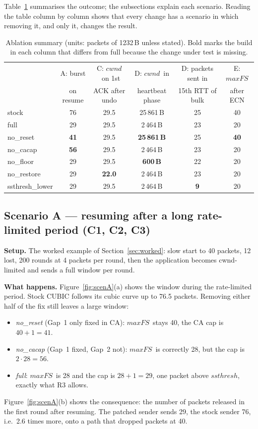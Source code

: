 \documentclass[11pt,a4paper]{article}
\newcommand{\maxfs}{\ensuremath{\mathit{maxFS}}}
\newcommand{\cwnd}{\ensuremath{\mathit{cwnd}}}
\newcommand{\ssthresh}{\ensuremath{\mathit{ssthresh}}}
\begin{document}
Table~\ref{tab:ablation} summarises the outcome; the subsections explain each
scenario. Reading the table column by column shows that every change has a
scenario in which removing it, and only it, changes the result.

\begin{table}[ht]
\centering
\small
\caption{Ablation summary (units: packets of 1232\,B unless stated). Bold
  marks the build in each column that differs from \textcolor{patched}{full}
  because the change under test is missing.}
\label{tab:ablation}
\begin{tabular}{@{}lccccc@{}}
\toprule
 & A: burst & C: \cwnd\ on 1st & D: \cwnd\ in & D: packets sent in & E: \maxfs \\
 & on resume & ACK after undo & heartbeat phase & 15th RTT of bulk & after ECN \\
\midrule
\textcolor{stock}{stock}   & 76 & 29.5 & 25\,861\,B & 25 & 40 \\
\textcolor{patched}{full}  & 29 & 29.5 & 2\,464\,B  & 23 & 20 \\
no\_reset       & \textbf{41} & 29.5 & \textbf{25\,861\,B} & 25 & \textbf{40} \\
no\_cacap       & \textbf{56} & 29.5 & 2\,464\,B  & 23 & 20 \\
no\_floor       & 29 & 29.5 & \textbf{600\,B} & 22 & 20 \\
no\_restore     & 29 & \textbf{22.0} & 2\,464\,B  & 23 & 20 \\
ssthresh\_lower & 29 & 29.5 & 2\,464\,B  & \textbf{9} & 20 \\
\bottomrule
\end{tabular}
\end{table}

\subsection{Scenario A --- resuming after a long rate-limited period (C1, C2, C3)}
\label{sec:scenA}

\textbf{Setup.} The worked example of Section~\ref{sec:worked}: slow start to
40 packets, 12 lost, 200 rounds at 4 packets per round, then the application
becomes cwnd-limited and sends a full window per round.

\textbf{What happens.} Figure~\ref{fig:scenA}(a) shows the window during the
rate-limited period. Stock CUBIC follows its cubic curve up to 76.5 packets.
Removing either half of the fix still leaves a large window:
\begin{itemize}
  \item \emph{no\_reset} (Gap~1 only fixed in CA): \maxfs\ stays 40, the CA
        cap is $40+1 = 41$.
  \item \emph{no\_cacap} (Gap~1 fixed, Gap~2 not): \maxfs\ is correctly 28,
        but the cap is $2\cdot 28 = 56$.
  \item \emph{full}: \maxfs\ is 28 and the cap is $28+1 = 29$, one packet above
        \ssthresh, exactly what R3 allows.
\end{itemize}
Figure~\ref{fig:scenA}(b) shows the consequence: the number of packets
released in the first round after resuming. The patched sender sends 29,
the stock sender 76, i.e.\ 2.6 times more, onto a path that dropped
packets at 40.
\end{document}
